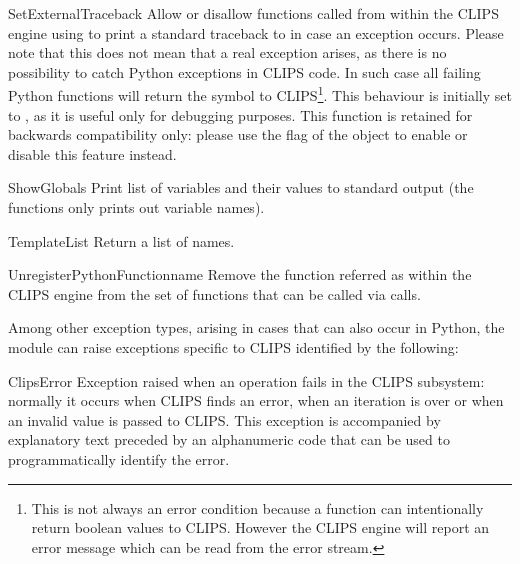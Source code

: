 \begin{funcdesc}{SetExternalTraceback}{}
Allow or disallow functions called from within the CLIPS engine using
 to print a standard traceback to  in
case an exception occurs. Please note that this does not mean that a
real exception arises, as there is no possibility to catch Python
exceptions in CLIPS code. In such case all failing Python functions will
return the symbol  to CLIPS\footnote{This is not always an
error condition because a function can intentionally return boolean
values to CLIPS. However the CLIPS engine will report an error message
which can be read from the error stream.}. This behaviour is initially
set to , as it is useful only for debugging purposes.
This function is retained for backwards compatibility only: please use the
 flag of the  object to enable or
disable this feature instead.
\end{funcdesc}

\begin{funcdesc}{ShowGlobals}{}
Print list of  variables and their values to standard
output (the  functions only prints out
 variable names).
\end{funcdesc}

\begin{funcdesc}{TemplateList}{}
Return a list of  names.
\end{funcdesc}

\begin{funcdesc}{UnregisterPythonFunction}{name}
Remove the function referred as  within the CLIPS engine from
the set of functions that can be called via  calls.
\end{funcdesc}

\medskip{}

Among other exception types, arising in cases that can also occur in
Python, the \pyclips{} module can raise exceptions specific to CLIPS
identified by the following:

\begin{excdesc}{ClipsError}
Exception raised when an operation fails in the CLIPS subsystem: normally
it occurs when CLIPS finds an error, when an iteration is over or when an
invalid value is passed to CLIPS. This exception is accompanied by
explanatory text preceded by an alphanumeric code that can be used
to programmatically identify the error.
\end{excdesc}

